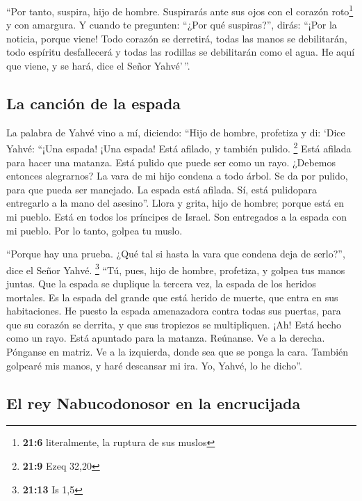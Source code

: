 \begin{paracol}{2}
 ``Por tanto, suspira, hijo de hombre. Suspirarás ante sus
ojos con el corazón roto\footnote{\textbf{21:6} literalmente, la ruptura
  de sus muslos} y con amargura.  Y cuando te pregunten:
``¿Por qué suspiras?'', dirás: ``¡Por la noticia, porque viene! Todo
corazón se derretirá, todas las manos se debilitarán, todo espíritu
desfallecerá y todas las rodillas se debilitarán como el agua. He aquí
que viene, y se hará, dice el Señor Yahvé'\,''.

\hypertarget{la-canciuxf3n-de-la-espada}{%
\subsection{La canción de la espada}\label{la-canciuxf3n-de-la-espada}}

 La palabra de Yahvé vino a mí, diciendo: 
``Hijo de hombre, profetiza y di: `Dice Yahvé: ``¡Una espada! ¡Una
espada! Está afilado, y también pulido. \footnote{\textbf{21:9} Ezeq
  32,20}  Está afilada para hacer una matanza. Está
pulido que puede ser como un rayo. ¿Debemos entonces alegrarnos? La vara
de mi hijo condena a todo árbol.  Se da por pulido, para
que pueda ser manejado. La espada está afilada. Sí, está pulidopara
entregarlo a la mano del asesino''.  Llora y grita, hijo
de hombre; porque está en mi pueblo. Está en todos los príncipes de
Israel. Son entregados a la espada con mi pueblo. Por lo tanto, golpea
tu muslo.

 ``Porque hay una prueba. ¿Qué tal si hasta la vara que
condena deja de serlo?'', dice el Señor Yahvé. \footnote{\textbf{21:13}
  Is 1,5}  ``Tú, pues, hijo de hombre, profetiza, y
golpea tus manos juntas. Que la espada se duplique la tercera vez, la
espada de los heridos mortales. Es la espada del grande que está herido
de muerte, que entra en sus habitaciones.  He puesto la
espada amenazadora contra todas sus puertas, para que su corazón se
derrita, y que sus tropiezos se multipliquen. ¡Ah! Está hecho como un
rayo. Está apuntado para la matanza.  Reúnanse. Ve a la
derecha. Pónganse en matriz. Ve a la izquierda, donde sea que se ponga
la cara.  También golpearé mis manos, y haré descansar mi
ira. Yo, Yahvé, lo he dicho''.

\hypertarget{el-rey-nabucodonosor-en-la-encrucijada}{%
\subsection{El rey Nabucodonosor en la
encrucijada}\label{el-rey-nabucodonosor-en-la-encrucijada}}


\end{paracol}
